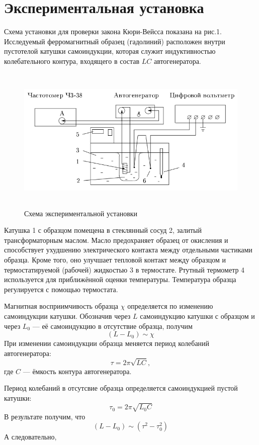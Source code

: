 \documentclass[12pt]{article}
\begin{document}
\section*{Экспериментальная установка}
\par
	Схема установки для проверки закона Кюри-Вейсса показана на рис.1. Исследуемый ферромагнитный образец (гадолиний) расположен внутри пустотелой катушки самоиндукции, которая служит индуктивностью колебательного контура, входящего в состав $LC$ автогенератора.
\begin{figure}[h!]
	\centering
	\includegraphics[width = 12cm, height=7cm]{image1.png}
	\caption{Схема экспериментальной установки}
\end{figure}
\par
	Катушка 1 с образцом помещена в стеклянный сосуд 2, залитый трансформаторным маслом. Масло предохраняет образец от окисления и способствует ухудшению электрического контакта между отдельными частиками образца. Кроме того, оно улучшает тепловой контакт между образцом и термостатируемой (рабочей) жидкостью 3 в термостате. Ртутный термометр 4 используется для приближённой оценки температуры. Температура образца регулируется с помощью термостата.
\par
	Магнитная восприимчивость образца $\chi$ определяется по изменению самоиндукции катушки. Обозначив через $L$ самоиндукцию катушки с образцом и через $L_0$ --- её самоиндукцию в отсутствие образца, получим
\[
	\left(L - L_0\right) \sim \chi
\]
При изменении самоиндукции образца меняется период колебаний автогенератора:
\[
	\tau = 2 \pi \sqrt{LC},
\]
где $C$ --- ёмкость контура автогенератора.	
\par
	Период колебаний в отсутсвие образца определяется самоиндукцией пустой катушки:
\[
	\tau_0 = 2 \pi \sqrt{L_0 C}
\]
В результате получим, что
\[
	\left(L - L_0\right) \sim \left(\tau^2 - \tau_0^2 \right)
\]
А следовательно,
\end{document}
